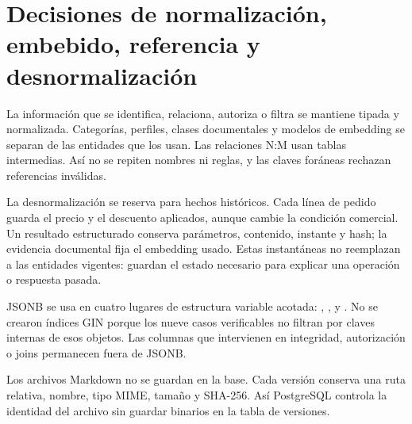 \section{Decisiones de normalización, embebido, referencia y desnormalización}

La información que se identifica, relaciona, autoriza o filtra se mantiene
tipada y normalizada. Categorías, perfiles, clases documentales y modelos de
embedding se separan de las entidades que los usan. Las relaciones N:M usan
tablas intermedias. Así no se repiten nombres ni reglas, y las claves foráneas
rechazan referencias inválidas.

La desnormalización se reserva para hechos históricos. Cada línea de pedido
guarda el precio y el descuento aplicados, aunque cambie la condición
comercial. Un resultado estructurado conserva parámetros, contenido, instante y
hash; la evidencia documental fija el embedding usado. Estas instantáneas no
reemplazan a las entidades vigentes: guardan el estado necesario para explicar
una operación o respuesta pasada.

JSONB se usa en cuatro lugares de estructura variable acotada:
,
,
 y
. No se crearon índices GIN porque los
nueve casos verificables no filtran por claves internas de esos objetos. Las
columnas que intervienen en integridad, autorización o joins permanecen fuera
de JSONB.

Los archivos Markdown no se guardan en la base. Cada versión conserva una ruta
relativa, nombre, tipo MIME, tamaño y SHA-256. Así PostgreSQL controla la
identidad del archivo sin guardar binarios en la tabla de versiones.

